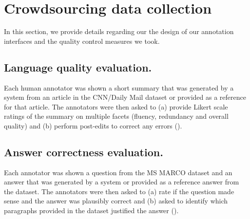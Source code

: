 \section{\label{sec:price:interfaces} Crowdsourcing data collection}

In this section, we provide details regarding our the design of our annotation interfaces and the quality control measures we took.

\subsection{Language quality evaluation.}
Each human annotator was shown a short summary that was generated by a system from an article in the CNN/Daily Mail dataset or provided as a reference for that article.
The annotators were then asked to (a) provide Likert scale ratings of the summary on multiple facets (fluency, redundancy and overall quality) and (b) perform post-edits to correct any errors ().

\subsection{Answer correctness evaluation.}
Each annotator was shown a question from the MS MARCO dataset and an answer that was generated by a system or provided as a reference answer from the dataset.
The annotators were then asked to (a) rate if the question made sense and the answer was plausibly correct and (b) asked to identify which paragraphs provided in the dataset justified the answer ().

%
